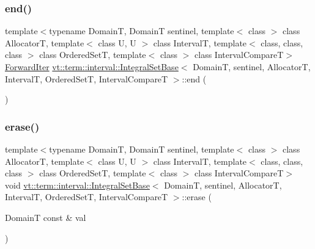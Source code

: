 \mbox{\label{structvt_1_1term_1_1interval_1_1_integral_set_base_aaec7a0f928c035753685be34d0cc54f8}} 
\subsubsection{\texorpdfstring{end()}{end()}}
{\footnotesize\ttfamily template$<$typename DomainT, DomainT sentinel, template$<$ class $>$ class AllocatorT, template$<$ class U, U $>$ class IntervalT, template$<$ class, class, class $>$ class Ordered\+SetT, template$<$ class $>$ class Interval\+CompareT$>$ \\
\hyperlink{structvt_1_1term_1_1interval_1_1_integral_set_base_abd0d7f40a96384d2db0a2782a8921a34}{Forward\+Iter} \hyperlink{structvt_1_1term_1_1interval_1_1_integral_set_base}{vt\+::term\+::interval\+::\+Integral\+Set\+Base}$<$ DomainT, sentinel, AllocatorT, IntervalT, Ordered\+SetT, Interval\+CompareT $>$\+::end (\begin{DoxyParamCaption}{ }\end{DoxyParamCaption})\hspace{0.3cm}{\ttfamily [inline]}}

\mbox{\label{structvt_1_1term_1_1interval_1_1_integral_set_base_a26d04c73487d5911c447e627dae87627}} 
\subsubsection{\texorpdfstring{erase()}{erase()}}
{\footnotesize\ttfamily template$<$typename DomainT, DomainT sentinel, template$<$ class $>$ class AllocatorT, template$<$ class U, U $>$ class IntervalT, template$<$ class, class, class $>$ class Ordered\+SetT, template$<$ class $>$ class Interval\+CompareT$>$ \\
void \hyperlink{structvt_1_1term_1_1interval_1_1_integral_set_base}{vt\+::term\+::interval\+::\+Integral\+Set\+Base}$<$ DomainT, sentinel, AllocatorT, IntervalT, Ordered\+SetT, Interval\+CompareT $>$\+::erase (\begin{DoxyParamCaption}\item[{DomainT const \&}]{val }\end{DoxyParamCaption})\hspace{0.3cm}{\ttfamily [inline]}}

